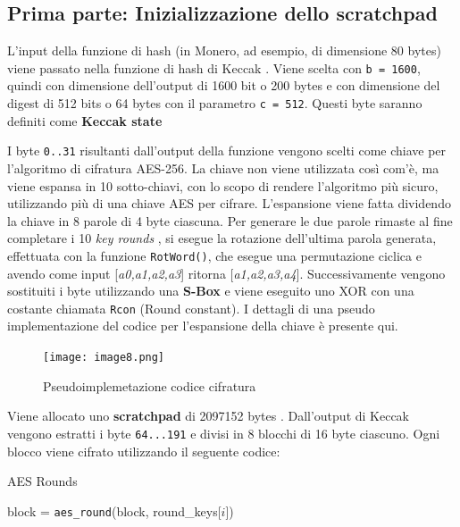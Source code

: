\subsection{Prima parte: Inizializzazione dello scratchpad} \label{prima-parte-inizializzazione-dello-scratchpad}
L'input della funzione di hash (in Monero, ad esempio, di dimensione 80
bytes) viene passato nella funzione di hash di Keccak \cite{bertoni2011keccak}. Viene scelta con
\texttt{b\ =\ 1600}, quindi con dimensione dell'output di 1600 bit o 200
bytes e con dimensione del digest di 512 bits o 64 bytes con il
parametro \texttt{c\ =\ 512}. Questi byte saranno definiti come
\textbf{Keccak state} \cite{keccak_parameters}

I byte \texttt{0..31} risultanti dall'output della funzione vengono
scelti come chiave per l'algoritmo di cifratura AES-256. La chiave non
viene utilizzata così com'è, ma viene espansa \cite{standard2001federal} in 10 sotto-chiavi, con lo
scopo di rendere l'algoritmo più sicuro, utilizzando più di una chiave
AES per cifrare. L'espansione viene fatta dividendo la chiave in 8
parole di 4 byte ciascuna. Per generare le due parole rimaste al fine
completare i 10 \emph{key rounds} , si esegue la rotazione
dell'ultima parola generata, effettuata con la funzione
\texttt{RotWord()}, che esegue una permutazione ciclica e avendo come
input {[}\emph{a0,a1,a2,a3}{]} ritorna {[}\emph{a1,a2,a3,a4}{]}.
Successivamente vengono sostituiti i byte utilizzando una \textbf{S-Box}
e viene eseguito uno XOR con una costante chiamata \texttt{Rcon} (Round
constant). I dettagli di una pseudo implementazione del codice per
l'espansione della chiave è presente qui.

\begin{figure}[h!]
  \centering
  \texttt{[image: image8.png]}
  \caption{Pseudoimplemetazione codice cifratura}
\end{figure}

Viene allocato uno \textbf{scratchpad} di 2097152 bytes \cite{crypto_note_standard_cryptonight}.
Dall'output di Keccak vengono estratti i byte \texttt{64...191} e divisi
in 8 blocchi di 16 byte ciascuno. Ogni blocco viene cifrato utilizzando
il seguente codice:

\begin{algorithm}
  \caption{AES Rounds}
  \begin{algorithmic}[1]
      \State block = \texttt{aes\_round}(block, round\_keys[$i$])
  \EndFor
  \end{algorithmic}
  \end{algorithm}



